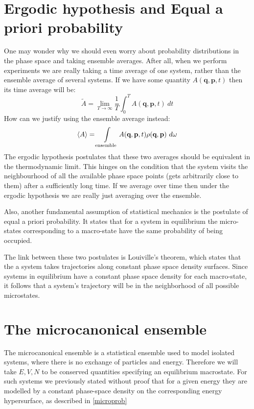 \documentclass[a4paper,11pt,oneside]{book}
\begin{document}
\section{Ergodic hypothesis and Equal a priori probability}
One may wonder why we should even worry about probability distributions in the phase space and taking ensemble averages. After all, when we perform experiments we are really taking a time average of one system, rather than the ensemble average of several systems. If we have some quantity $A(\textbf{q},\textbf{p},t)$ then its time average will be:
\begin{equation}
    \tilde A = \lim_{T \rightarrow \infty} \frac{1}{T} \int_0^T A(\textbf{q},\textbf{p},t) \ dt
\end{equation}
How can we justify using the ensemble average instead:
\begin{equation}
    \braket{A} = \int \limits_{\text{ensemble}} A(\textbf{q},\textbf{p},t) \rho(\textbf{q},\textbf{p}) \ d\omega
\end{equation}
The ergodic hypothesis postulates that these two averages should be equivalent in the thermodynamic limit. This hinges on the condition that the system visits the neighbourhood of all the available phase space points (gets arbitrarily close to them) after a sufficiently long time. If we average over time then under the ergodic hypothesis we are really just averaging over the ensemble. 
  
  
Also, another fundamental assumption of statistical mechanics is the postulate of equal a priori probability. It states that for a system in equilibrium the micro-states corresponding to a macro-state have the same probability of being occupied. 


The link between these two postulates is Louiville's theorem, which states that the a system takes trajectories along constant phase space density surfaces. Since systems in equilibrium have a constant phase space density for each macro-state, it follows that a system's trajectory will be in the neighborhood of all possible microstates. 
\section{The microcanonical ensemble}
The microcanonical ensemble is a statistical ensemble used to model isolated systems, where there is no exchange of particles and energy. Therefore we will take $E,V,N$ to be conserved quantities specifying an equilibrium macrostate. For such systems we previously stated without proof that for a given energy they are modelled by a constant phase-space density on the corresponding energy hypersurface, as described in \eqref{microprob}
\end{document}
